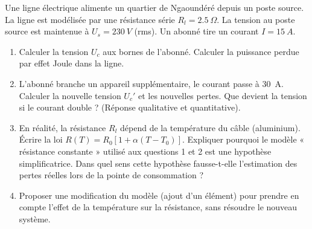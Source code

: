 \documentclass[11pt]{article}
\begin{document}
\begin{exercice}
Une ligne électrique alimente un quartier de Ngaoundéré depuis un poste source. La ligne est modélisée par une résistance série $R_l = \SI{2,5}{\Omega}$. La tension au poste source est maintenue à $U_s = \SI{230}{V}$ (rms). Un abonné tire un courant $I = \SI{15}{A}$.

\begin{enumerate}
    \item Calculer la tension $U_c$ aux bornes de l'abonné. Calculer la puissance perdue par effet Joule dans la ligne.
    \item L'abonné branche un appareil supplémentaire, le courant passe à \SI{30}{A}. Calculer la nouvelle tension $U_c'$ et les nouvelles pertes. Que devient la tension si le courant double ? (Réponse qualitative et quantitative).
    \item En réalité, la résistance $R_l$ dépend de la température du câble (aluminium). Écrire la loi $R(T) = R_0[1 + \alpha(T-T_0)]$. Expliquer pourquoi le modèle « résistance constante » utilisé aux questions 1 et 2 est une hypothèse simplificatrice. Dans quel sens cette hypothèse fausse-t-elle l'estimation des pertes réelles lors de la pointe de consommation ?
    \item Proposer une modification du modèle (ajout d'un élément) pour prendre en compte l'effet de la température sur la résistance, sans résoudre le nouveau système.
\end{enumerate}
\end{exercice}
\end{document}
